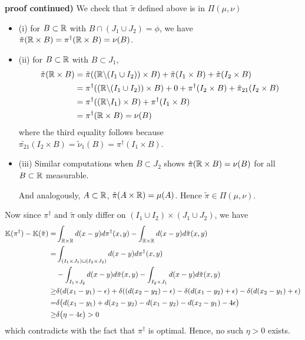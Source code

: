 \documentclass[12pt,a4paper]{article}
\newenvironment{proof}
{\begin{changemargin}{1cm}{0.5cm} 
	}%
	{\end{changemargin}
}
\renewenvironment{i}
{\begin{itemize} 
	}%
	{\end{itemize}
}
\newenvironment{p}
{\begin{proof} 
	}%
	{\end{proof}
}
\begin{document}
\begin{p}
\textbf{proof continued)} We check that $\tilde{\pi}$ defined above is in $\Pi(\mu, \nu)$
\begin{i}
\item[(i)] for $B\subset \mathbb{R}$ with $B\cap (J_1 \cup J_2) = \phi$, we have $\tilde{\pi}(\mathbb{R} \times B) = \pi^{\dagger}(\mathbb{R} \times B) = \nu(B)$.
\item[(ii)] for $B\subset \mathbb{R}$ with $B\subset J_1$, 
\begin{align*}
\tilde{\pi}(\mathbb{R} \times B) &= \tilde{\pi}((\mathbb{R} \backslash (I_1 \cup I_2))\times B) + \tilde{\pi}(I_1\times B) + \tilde{\pi}(I_2 \times B)  \\
&= \pi^{\dagger}((\mathbb{R} \backslash (I_1 \cup I_2))\times B) + 0 + \pi^{\dagger}(I_2 \times B) + \tilde{\pi}_{21}(I_2\times B) \\
&= \pi^{\dagger}((\mathbb{R} \backslash I_1)\times B) + \pi^{\dagger}(I_1 \times B) \\
&=\pi^{\dagger}(\mathbb{R} \times B)  =\nu(B)
\end{align*}
where the third equality follows because $\tilde{\pi_{21}}(I_2\times B) = \tilde{\nu}_1 (B) = \pi^{\dagger}(I_1 \times B)$.

\item[(iii)] Similar computations when $B\subset J_2$ shows $\tilde{\pi}(\mathbb{R} \times B) = \nu(B)$ for all $B\subset \mathbb{R}$ measurable.

And analogously, $A\subset \mathbb{R}$, $\tilde{\pi}(A\times \mathbb{R}) = \mu(A)$. Hence $\tilde{\pi} \in \Pi(\mu, \nu)$.
\end{i}
Now since $\pi^{\dagger}$ and $\tilde{\pi}$ only differ on $(I_1 \cup I_2) \times (J_1 \cup J_2)$, we have
\begin{align*}
\mathbb{K}(\pi^{\dagger}) - \mathbb{K}(\tilde{\pi}) =& \int_{\mathbb{R} \times \mathbb{R}} d(x-y) d\pi^{\dagger}(x,y) - \int_{\mathbb{R} \times \mathbb{R}} d(x-y) d\tilde{\pi}(x,y) \\
=& \int_{(I_1 \times J_1)\cup (I_2 \times J_2)} d(x-y) d\pi^{\dagger}(x,y)  \\
&- \int_{I_1 \times J_2} d(x-y) d\tilde{\pi}(x,y) - \int_{I_2 \times J_1} d(x-y) d\tilde{\pi}(x,y) \\
\geq & \delta (d(x_1-y_1) - \epsilon) + \delta((d(x_2-y_2)  - \epsilon) - \delta(d(x_1-y_2)+\epsilon) - \delta(d(x_2-y_1) + \epsilon) \\
= &  \delta \big( d(x_1-y_1) + d(x_2-y_2) - d(x_1-y_2)-d(x_2-y_1) -4\epsilon\big) \\
\geq & \delta \big(\eta - 4\epsilon \big) > 0
\end{align*}
which contradicts with the fact that $\pi^{\dagger}$ is optimal. Hence, no such $\eta>0$ exists.
\s


\end{p}
\end{document}
